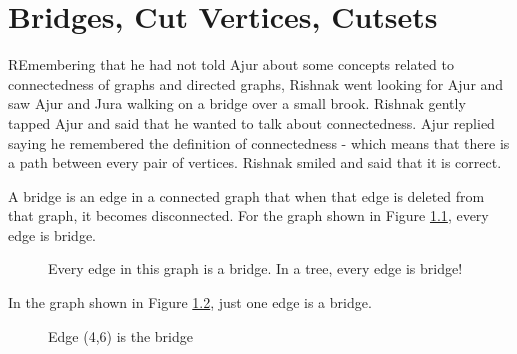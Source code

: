 \chapter{Bridges, Cut Vertices, Cutsets}

REmembering that he had not told Ajur about some concepts related to connectedness of graphs and directed graphs, Rishnak went looking for Ajur and saw Ajur and Jura walking on a bridge over a small brook. Rishnak gently tapped Ajur and said that 
he wanted to talk about connectedness. Ajur replied saying he remembered the definition of connectedness - which means that there is a path between every pair of vertices. Rishnak smiled and said that it is correct.

A bridge is an edge in a connected graph that when that edge is deleted from that graph, it becomes disconnected. For the graph shown in Figure \ref{14g1}, every edge is bridge.
\begin{figure}
\begin{center}

\caption{ Every edge in this graph is a bridge. In a tree, every edge is bridge!}\label{14g1}
\end{center}
\end{figure}

In the graph shown in Figure \ref{14g2}, just one edge is a bridge.

\begin{figure}
\begin{center}
\caption{Edge (4,6) is the bridge}\label{14g2}
\end{center}
\end{figure}

